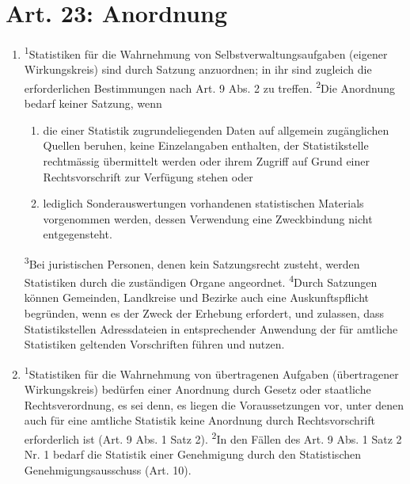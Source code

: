 \documentclass[A4, 12pt]{scrbook}
\begin{document}
    \section{Art. 23: Anordnung}
        \begin{enumerate}[label=(\arabic*)]
            \item \textsuperscript{1}Statistiken für die Wahrnehmung von Selbstverwaltungsaufgaben (eigener Wirkungskreis) sind durch Satzung anzuordnen; in ihr sind zugleich die erforderlichen Bestimmungen nach Art. 9 Abs. 2 zu treffen. \textsuperscript{2}Die Anordnung bedarf keiner Satzung, wenn
                \begin{enumerate}[label=\arabic*.]
                    \item die einer Statistik zugrundeliegenden Daten auf allgemein zugänglichen Quellen beruhen, keine Einzelangaben enthalten, der Statistikstelle rechtmässig übermittelt werden oder ihrem Zugriff auf Grund einer Rechtsvorschrift zur Verfügung stehen oder
                    \item lediglich Sonderauswertungen vorhandenen statistischen Materials vorgenommen werden, dessen Verwendung eine Zweckbindung nicht entgegensteht.
                \end{enumerate}
                \textsuperscript{3}Bei juristischen Personen, denen kein Satzungsrecht zusteht, werden Statistiken durch die zuständigen Organe angeordnet. \textsuperscript{4}Durch Satzungen können Gemeinden, Landkreise und Bezirke auch eine Auskunftspflicht begründen, wenn es der Zweck der Erhebung erfordert, und zulassen, dass Statistikstellen Adressdateien in entsprechender Anwendung der für amtliche Statistiken geltenden Vorschriften führen und nutzen.
            \item \textsuperscript{1}Statistiken für die Wahrnehmung von übertragenen Aufgaben (übertragener Wirkungskreis) bedürfen einer Anordnung durch Gesetz oder staatliche Rechtsverordnung, es sei denn, es liegen die Voraussetzungen vor, unter denen auch für eine amtliche Statistik keine Anordnung durch Rechtsvorschrift erforderlich ist (Art. 9 Abs. 1 Satz 2). \textsuperscript{2}In den Fällen des Art. 9 Abs. 1 Satz 2 Nr. 1 bedarf die Statistik einer Genehmigung durch den Statistischen Genehmigungsausschuss (Art. 10).
        \end{enumerate}
\end{document}

